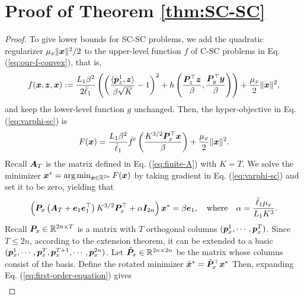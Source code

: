 \section{Proof of Theorem \ref{thm:SC-SC}}  \label{apx:proof-thm-SCSC}
\begin{proof}
To give lower bounds for SC-SC problems, we add the quadratic regularizer $\mu_x \Vert {\bm{x}} \Vert^2/2$ to the upper-level function $f$ of C-SC problems in Eq. (\ref{eq:our-f-convex}), that is,
\begin{align*} 
    f({\bm{x}},{\bm{z}},{\bm{x}}) :=  \frac{L_1 \beta^2}{2\bar \ell_1} \left(
    \left( \frac{\langle {\bm{p}}_z^1, {\bm{z}}\rangle}{\beta \sqrt{K}} - 1 \right)^2 + h\left(\frac{{\bm{P}}_z^\top {\bm{z}}}{\beta},\frac{{\bm{P}}_y^\top {\bm{y}}}{\beta} \right) \right)
    + \frac{\mu_x}{2} \Vert {\bm{x}} \Vert^2,
\end{align*}
and keep the lower-level function $g$ unchanged. Then, the hyper-objective in Eq. (\ref{eq:varphi-sc}) is
\begin{align*} 
      F({\bm{x}}) 
   = \frac{L_1 \beta^2}{\bar \ell_1} \bar f^{\rm c} \left(\frac{K^{3/2} {\bm{P}}_x^\top {\bm{x}}}{\beta}\right) + \frac{\mu_x}{2} \Vert {\bm{x}} \Vert^2.
\end{align*}
Recall ${\bm{A}}_{T}$ is the matrix defined in Eq. (\ref{eq:finite-A}) with $K = T$. We solve the minimizer  ${\bm{x}}^* = \arg \min_{{\bm{x}} \in {\mathbb{R}}^{2n}} F({\bm{x}})$ by taking gradient in Eq. (\ref{eq:varphi-sc}) and set it to be zero, yielding that
\begin{align} \label{eq:first-order-equation}
    \left({\bm{P}}_x \left( {\bm{A}}_{T} + {\bm{e}}_1 {\bm{e}}_1^\top \right) K^{3/2} {\bm{P}}_x^\top + \alpha {\bm{I}}_{2n} \right) {\bm{x}}^* = \beta {\bm{e}}_1, \quad {\rm where} \quad \alpha = \frac{\bar \ell_1 \mu_x}{L_1 K^3}.
\end{align} 
Recall ${\bm{P}}_x \in {\mathbb{R}}^{2 n \times T}$ is a matrix with $T$ orthogonal columns $({\bm{p}}_x^1, \cdots, {\bm{p}}_x^T)$. Since $T \le 2 n$, according to the extension theorem, it can be extended to a basic $({\bm{p}}_x^1, \cdots, {\bm{p}}_x^T, {\bm{p}}_x^{T+1}, \cdots, {\bm{p}}_x^{2n})$. Let $\tilde {{\bm{P}}}_x \in {\mathbb{R}}^{2n \times 2n} $ be the matrix whose columns consist of the basis.
Define the rotated minimizer $\tilde {{\bm{x}}}^* = \tilde {{\bm{P}}}_x^\top {\bm{x}}^*$
Then, expanding Eq. (\ref{eq:first-order-equation}) gives 
\begin{align} \label{eq:three-term}

\end{align}
\end{proof}
